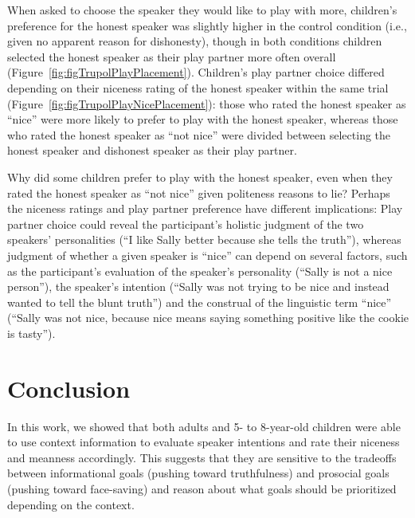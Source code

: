 \documentclass[oneside]{report}
\begin{document}
When asked to choose the speaker they would like to play with more,
children's preference for the honest speaker was slightly higher in the
control condition (i.e., given no apparent reason for dishonesty),
though in both conditions children selected the honest speaker as their
play partner more often overall
(Figure~\ref{fig:figTrupolPlayPlacement}). Children's play partner
choice differed depending on their niceness rating of the honest speaker
within the same trial (Figure~\ref{fig:figTrupolPlayNicePlacement}):
those who rated the honest speaker as ``nice'' were more likely to
prefer to play with the honest speaker, whereas those who rated the
honest speaker as ``not nice'' were divided between selecting the honest
speaker and dishonest speaker as their play partner.

Why did some children prefer to play with the honest speaker, even when
they rated the honest speaker as ``not nice'' given politeness reasons
to lie? Perhaps the niceness ratings and play partner preference have
different implications: Play partner choice could reveal the
participant's holistic judgment of the two speakers' personalities (``I
like Sally better because she tells the truth''), whereas judgment of
whether a given speaker is ``nice'' can depend on several factors, such
as the participant's evaluation of the speaker's personality (``Sally is
not a nice person''), the speaker's intention (``Sally was not trying to
be nice and instead wanted to tell the blunt truth'') and the construal
of the linguistic term ``nice'' (``Sally was not nice, because nice
means saying something positive like the cookie is tasty'').

\section{Conclusion}\label{conclusion}

In this work, we showed that both adults and 5- to 8-year-old children
were able to use context information to evaluate speaker intentions and
rate their niceness and meanness accordingly. This suggests that they
are sensitive to the tradeoffs between informational goals (pushing
toward truthfulness) and prosocial goals (pushing toward face-saving)
and reason about what goals should be prioritized depending on the
context.
\end{document}
